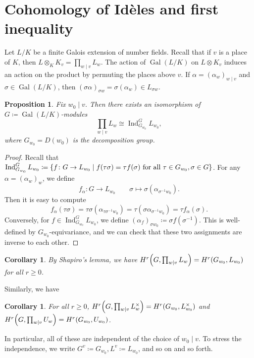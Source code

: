 \documentclass[leqno, openany]{memoir}
\newtheorem{cor}[thm]{Corollary}
\newtheorem{prop}[thm]{Proposition}
\theoremstyle{definition}
\theoremstyle{remark}
\theoremstyle{plain}
\theoremstyle{definition}
\theoremstyle{remark}
\DeclareMathOperator{\Gal}{Gal}
\DeclareMathOperator{\Ind}{Ind}
\begin{document}
\section{Cohomology of Id\`eles and first inequality}%
\label{sec:cohomology_of_id`eles}

Let $L/K$ be a finite Galois extension of number fields. Recall that if $v$ is a place of $K$, then $L \otimes_K K_v = \prod_{w \mid v} L_w$. The action of $\Gal(L/K)$ on $L \otimes K_v$ induces an action on the product by permuting the places above $v$. If $\alpha = {(\alpha_w)}_{w \mid v}$ and $\sigma \in \Gal(L/K)$, then ${(\sigma \alpha)}_{\sigma w} = \sigma (\alpha_w) \in L_{\sigma w}$.

\begin{prop}
    Fix $w_0 \mid v$. Then there exists an isomorphism of $G \coloneqq \Gal(L/K)$-modules
    \[ \prod_{w \mid v} L_w \cong \Ind_{G_{w_0}}^G L_{w_0}, \]
    where $G_{w_0} = D(w_0)$ is the decomposition group.
\end{prop}

\begin{proof}
    Recall that $\Ind_{G_{w_0}}^G L_{w_0} \coloneqq \qty{f \colon G \to L_{w_0} \mid f(\tau \sigma) = \tau f(\sigma)\text{ for all }\tau \in G_{w_0}, \sigma \in G}$. For any $\alpha = {(\alpha_w)}_w$, we define
    \[ f_{\alpha} \colon G \to L_{w_0} \qquad \sigma \mapsto \sigma(\alpha_{\sigma^{-1} w_0}). \]
    Then it is easy to compute
    \[ f_{\alpha}(\tau \sigma) = \tau \sigma (\alpha_{\tau \sigma^{-1} w_0}) = \tau (\sigma \alpha_{\sigma^{-1} w_0}) = \tau f_{\alpha}(\sigma). \]
    Conversely, for $f \in \Ind_{G_{w_0}}^G L_{w_0}$, we define ${(\alpha_f)}_{\sigma w_0} \coloneqq \sigma f(\sigma^{-1})$. This is well-defined by $G_{w_0}$-equivariance, and we can check that these two assignments are inverse to each other.
\end{proof}

\begin{cor}
    By Shapiro's lemma, we have $H^r\qty(G, \prod_{w \mid v} L_w) = H^r(G_{w_0}, L_{w_0})$ for all $r \geq 0$.
\end{cor}

Similarly, we have
\begin{cor}
    For all $r \geq 0$, $H^r\qty(G, \prod_{w \mid v} L_w^{\times}) = H^r(G_{w_0}, L_{w_0}^{\times})$ and $H^r\qty(G, \prod_{w \mid v} U_w) = H^r(G_{w_0}, U_{w_0})$. 
\end{cor}

In particular, all of these are independent of the choice of $w_0 \mid v$. To stress the independence, we write $G^v \coloneqq G_{w_0}, L^v \coloneqq L_{w_0}$, and so on and so forth. 
\end{document}
